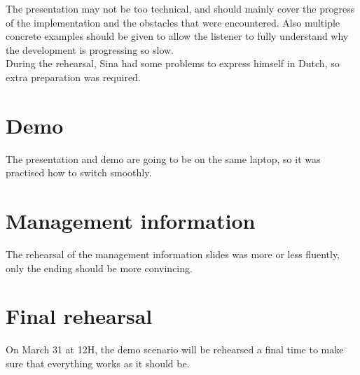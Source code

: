 \documentclass[a4paper, 12pt]{article}
\begin{document}
The presentation may not be too technical, and should mainly cover the progress of the implementation and the obstacles that were encountered. Also multiple concrete examples should be given to allow the listener to fully understand why the development is progressing so slow. \\

During the rehearsal, Sina had some problems to express himself in Dutch, so extra preparation was required. 

\section{Demo}

The presentation and demo are going to be on the same laptop, so it was practised how to switch smoothly. 


\section{Management information}

The rehearsal of the management information slides was more or less fluently, only the ending should be more convincing. 


\section{Final rehearsal}

On March 31 at 12H, the demo scenario will be rehearsed a final time to make sure that everything works as it should be. 



		
\end{document}
